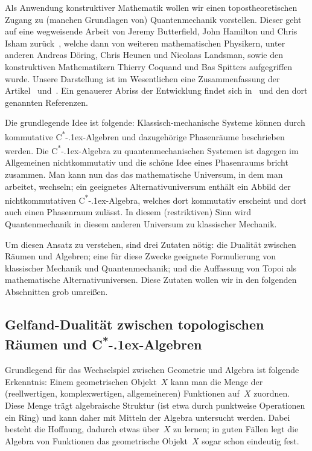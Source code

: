 \documentclass[a4paper,ngerman,12pt]{scrartcl}
\theoremstyle{definition}
\theoremstyle{plain}
\theoremstyle{remark}
\newcommand{\csalgebra}{C\textsuperscript{*}\kern-.1ex-Algebra}
\newcommand{\csalgebren}{C\textsuperscript{*}\kern-.1ex-Alge\-bren}
\renewcommand{\_}{\mathpunct{.}\,}
\newcommand{\?}{\,{:}\,}
\begin{document}
Als Anwendung konstruktiver Mathematik wollen wir einen topostheoretischen
Zugang zu (manchen Grundlagen von) Quantenmechanik vorstellen. Dieser geht auf
eine wegweisende Arbeit von Jeremy Butterfield, John Hamilton und Chris Isham
zurück~\cite{butterfield:hamilton:isham:1}, welche dann von weiteren
mathematischen Physikern, unter anderen Andreas Döring, Chris Heunen und Nicolaas
Landsman, sowie den konstruktiven Mathematikern Thierry Coquand und Bas Spitters
aufgegriffen wurde. Unsere Darstellung ist im Wesentlichen eine Zusammenfassung
der Artikel~\cite{topos:aqt} und~\cite{nlab:bohrtopos}. Ein genauerer Abriss
der Entwicklung findet sich in~\cite{nlab:bohrtopos} und den dort genannten
Referenzen.

Die grundlegende Idee ist folgende:
Klassisch-mechanische Systeme können durch kommutative \csalgebren{} und
dazugehörige Phasenräume beschrieben werden. Die \csalgebra{} zu
quantenmechanischen Systemen ist dagegen im Allgemeinen nichtkommutativ und die
schöne Idee eines Phasenraums bricht zusammen. Man kann nun das das
mathematische Universum, in dem man arbeitet, wechseln; ein geeignetes
Alternativuniversum enthält ein Abbild der nichtkommutativen \csalgebra,
welches dort kommutativ erscheint und dort auch einen Phasenraum zulässt. In
diesem (restriktiven) Sinn wird Quantenmechanik in diesem anderen Universum zu
klassischer Mechanik.

Um diesen Ansatz zu verstehen, sind drei Zutaten nötig: die Dualität zwischen
Räumen und Algebren; eine für diese Zwecke geeignete Formulierung von
klassischer Mechanik und Quantenmechanik; und die Auffassung von Topoi als
mathematische Alternativuniversen. Diese Zutaten wollen wir in den folgenden
Abschnitten grob umreißen.


\subsection{Gelfand-Dualität zwischen topologischen Räumen und \csalgebren}

Grundlegend für das Wechselspiel zwischen Geometrie und Algebra ist folgende
Erkenntnis: Einem geometrischen Objekt~$X$ kann man die Menge der
(reellwertigen, komplexwertigen, allgemeineren) Funktionen auf~$X$ zuordnen.
Diese Menge trägt algebraische Struktur (ist etwa durch punktweise Operationen ein Ring) und kann daher mit
Mitteln der Algebra untersucht werden. Dabei besteht die Hoffnung, dadurch
etwas über~$X$ zu lernen; in guten Fällen legt die Algebra von Funktionen
das geometrische Objekt~$X$ sogar schon eindeutig fest.
\end{document}
